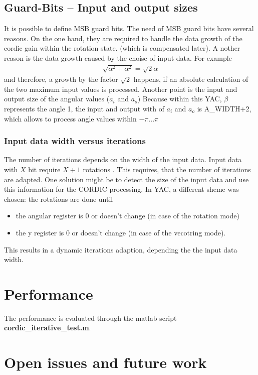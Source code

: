 \documentclass[a4paper, 12pt, notitlepage]{report}
\newcommand{\file}[1]{\textbf{#1}}
\begin{document}
\section{Guard-Bits -- Input and output sizes}
It is possible to define MSB guard bits.
The need of MSB guard bits have several reasons. On the one hand,
they are required to handle the data growth of the cordic gain within the rotation state.
(which is compensated later). A nother reason is the data growth caused by the choise of
input data. For example 
\begin{eqnarray}
   \sqrt{ \alpha^2 + \alpha^2 } = \sqrt{2} \alpha
\end{eqnarray}
and therefore, a growth by the factor $\sqrt{2}$ happens, if an absolute calculation
of the two maximum input values is processed.\newline
\newline
Another point is the input and output size of the angular values ($a_i$ and $a_o$)
Because within this YAC, $\beta$ represents the angle 1, the input and output with
of $a_i$ and $a_o$ is A\_WIDTH+2, which allows to process angle values within
$-\pi ... \pi$


\subsection{Input data width versus iterations}
The number of iterations depends on the width of the input data. 
Input data with $X$ bit require $X+1$ rotations \cite{dawid}.
This requires, that the number of iterations are adapted. One solution might
be to detect the size of the input data and use this information for the CORDIC processing.
In YAC, a different sheme was chosen: the rotations are done until 
\begin{itemize}
   \item the angular register is 0 or doesn't change (in case of the rotation mode) 
   \item the y register is 0 or doesn't change (in case of the vecotring mode).
\end{itemize}
This results in a dynamic iterations adaption, depending the the input data width.

\chapter{Performance}
The performance is evaluated through the matlab script \file{cordic\_iterative\_test.m}.


\chapter{Open issues and future work}
\end{document}
